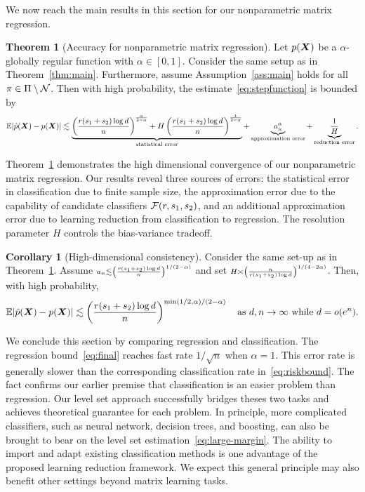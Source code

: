 \documentclass[11pt]{article}
\newcommand*{\KeepStyleUnderBrace}[1]{%
\mathop{%
\mathchoice
{\underbrace{\displaystyle#1}}%
{\underbrace{\textstyle#1}}%
{\underbrace{\scriptstyle#1}}%
{\underbrace{\scriptscriptstyle#1}}%
}\limits
}
\theoremstyle{definition}
\newtheorem{thm}{Theorem}[section]
\newtheorem{corollary}{Corollary}[section]
\begin{document}
We now reach the main results in this section for our nonparametric matrix regression. 

\begin{thm}[Accuracy for nonparametric matrix regression]\label{thm:regression} Let $p(\bm X)$ be a $\alpha$-globally regular function with $\alpha\in[0,1]$. Consider the same setup as in Theorem~\ref{thm:main}. Furthermore, assume Assumption~\ref{ass:main} holds for all $\pi\in\Pi\setminus \mathcal{N}$. Then with high probability, the estimate~\eqref{eq:stepfunction} is bounded by
\[
\mathbb{E}|\hat p(\mX)- p(\mX)| \lesssim  \KeepStyleUnderBrace{
\left({r(s_1+s_2)\log d\over n}\right)^{\alpha\over 2-\alpha}+H\left({r(s_1+s_2)\log d\over n}\right)^{1\over 2-\alpha}}_{\text{statistical error}} + \KeepStyleUnderBrace{a^\alpha_n}_{\text{approximation error}}+\KeepStyleUnderBrace{{1\over H}}_{\text{reduction error}}.
\]
\end{thm}

Theorem~\ref{thm:regression} demonstrates the high dimensional convergence of our nonparametric matrix regression. Our results reveal three sources of errors: the statistical error in classification due to finite sample size, the approximation error due to the capability of candidate classifiers $\mathcal{F}(r,s_1,s_2)$, and an additional approximation error due to learning reduction from classification to regression. The resolution parameter $H$ controls the bias-variance tradeoff. 

\begin{corollary}[High-dimensional consistency] Consider the same set-up as in Theorem~\ref{thm:regression}. Assume $\scriptstyle a_n \lesssim \left({r(s_1+s_2)\log d \over n}\right)^{1/(2-\alpha)}$ and set $\scriptstyle H\asymp \left({n\over r(s_1+s_2) \log d}\right)^{1/(4-2\alpha)}$. Then, with high probability,
\begin{equation}\label{eq:final}
\mathbb{E}|\hat p(\mX)- p(\mX)| \lesssim \left({r(s_1+s_2)\log d \over n}\right)^{\min(1/2,\alpha)/(2-\alpha)} \quad \text{as }d, n\to\infty \text{ while } d=o(e^{n}).
\vspace{-.3cm}
\end{equation}
\end{corollary}
We conclude this section by comparing regression and classification. The regression bound~\eqref{eq:final} reaches fast rate $1/\sqrt{n}$ when $\alpha=1$. This error rate is generally slower than the corresponding classification rate in~\eqref{eq:riskbound}. The fact confirms our earlier premise that classification is an easier problem than regression. Our level set approach successfully bridges theses two tasks and achieves theoretical guarantee for each problem. In principle, more complicated classifiers, such as neural network, decision trees, and boosting, can also be brought to bear on the level set estimation~\eqref{eq:large-margin}. The ability to import and adapt existing classification methods is one advantage of the proposed learning reduction framework. We expect this general principle may also benefit other settings beyond matrix learning tasks.  
\end{document}
